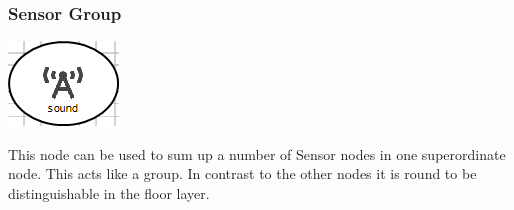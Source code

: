 \subsubsection{Sensor Group}
\noindent\begin{minipage}{0.15\textwidth}%
	\includegraphics[width=\linewidth]{assets/images/group}
\end{minipage}%
\hfill%
\begin{minipage}{0.8\textwidth}
	This node can be used to sum up a number of Sensor nodes in one superordinate node. This acts like a group. In contrast to the other nodes it is round to be distinguishable in the floor layer.
\end{minipage}


